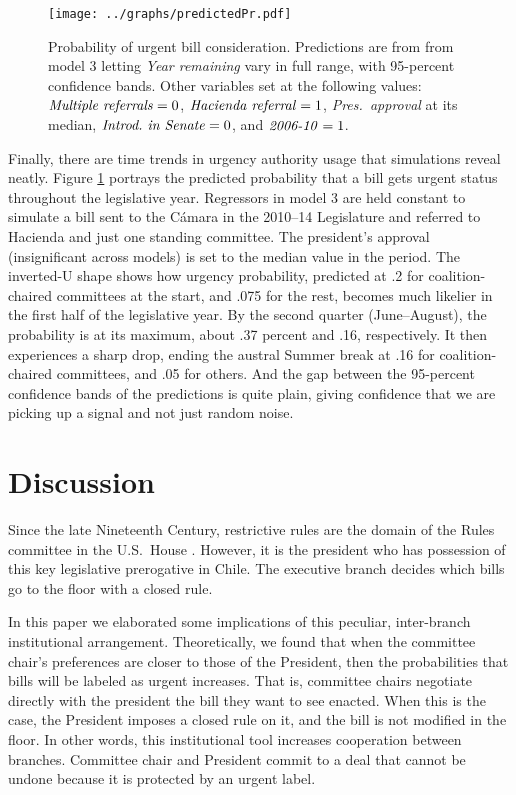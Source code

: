 \documentclass[letter,12pt]{article}
\begin{document}
\begin{figure}
  \centering
    \caption{Probability of urgent bill consideration. Predictions are from from model 3 letting \emph{Year remaining} vary in full range, with 95-percent confidence bands. Other variables set at the following values: $\text{\emph{Multiple referrals}}=0$, $\text{\emph{Hacienda referral}}=1$, \emph{Pres.~approval} at its median, $\text{\emph{Introd.~in~Senate}}=0$, and $\text{\emph{2006-10}}=1$.}\label{F:sims}
    \texttt{[image: ../graphs/predictedPr.pdf]}
\end{figure}

Finally, there are time trends in urgency authority usage that simulations reveal neatly. Figure \ref{F:sims} portrays the predicted probability that a bill gets urgent status throughout the legislative year. Regressors in model 3 are held constant to simulate a bill sent to the Cámara in the 2010--14 Legislature and referred to Hacienda and just one standing committee. The president's approval (insignificant across models) is set to the median value in the period. The inverted-U shape shows how urgency probability, predicted at .2 for coalition-chaired committees at the start, and .075 for the rest, becomes much likelier in the first half of the legislative year. By the second quarter (June--August), the probability is at its maximum, about .37 percent and .16, respectively. It then experiences a sharp drop, ending the austral Summer break at .16 for coalition-chaired committees, and .05 for others. And the gap between the 95-percent confidence bands of the predictions is quite plain, giving confidence that we are picking up a signal and not just random noise. 

\section{Discussion}

Since the late Nineteenth Century, restrictive rules are the domain of the Rules committee in the U.S.\ House \citep{denhartog.2004phd,cox.mccubbins.2005,sin.2014}. However, it is the president who has possession of this key legislative prerogative in Chile. The executive branch decides which bills go to the floor with a closed rule. 

In this paper we elaborated some implications of this peculiar, inter-branch institutional arrangement. Theoretically, we found that when the committee chair's preferences are closer to those of the President, then the probabilities that bills will be labeled as urgent increases. That is, committee chairs negotiate directly with the president the bill they want to see enacted.  When this is the case, the President imposes a closed rule on it, and the bill is not modified in the floor.  In other words, this institutional tool increases cooperation between branches. Committee chair and President commit to a deal that cannot be undone because it is protected by an urgent label.
\end{document}

